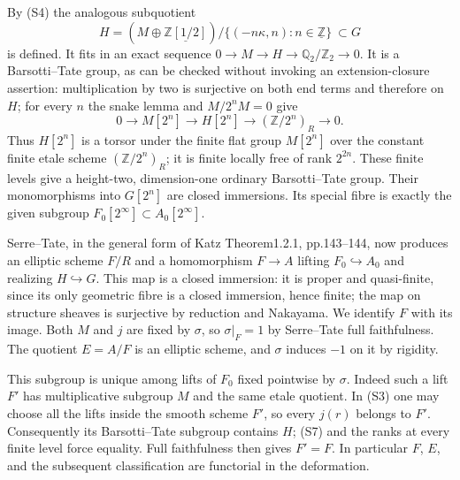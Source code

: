 By (S4) the analogous subquotient
\[
 H=(M\oplus\underline{\mathbb Z[1/2]})/
       \{(-n\kappa,n):n\in\underline{\mathbb Z}\}
       \ \subset G                                      \tag{S6}
\]
is defined. It fits in an exact sequence
$0\to M\to H\to\mathbb Q_2/\mathbb Z_2\to0$.
It is a Barsotti--Tate group, as can be checked without invoking an
extension-closure assertion: multiplication by two is surjective on
both end terms and therefore on $H$; for every $n$ the snake lemma
and $M/2^nM=0$ give
\[
 0\longrightarrow M[2^n]\longrightarrow H[2^n]
 \longrightarrow (\mathbb Z/2^n)_R\longrightarrow0.     \tag{S7}
\]
Thus $H[2^n]$ is a torsor under the finite flat group $M[2^n]$ over
the constant finite etale scheme $(\mathbb Z/2^n)_R$; it is finite
locally free of rank $2^{2n}$. These finite levels give a height-two,
dimension-one ordinary Barsotti--Tate group. Their monomorphisms into
$G[2^n]$ are closed immersions. Its special fibre is exactly the
given subgroup $F_0[2^\infty]\subset A_0[2^\infty]$.

Serre--Tate, in the general form of Katz Theorem1.2.1,
pp.143--144, now produces an elliptic scheme $F/R$ and a
homomorphism $F\to A$ lifting $F_0\hookrightarrow A_0$ and
realizing $H\hookrightarrow G$. This map is a closed immersion:
it is proper and quasi-finite, since its only geometric fibre is a
closed immersion, hence finite; the map on structure sheaves is
surjective by reduction and Nakayama. We identify $F$ with its image.
Both $M$ and $j$ are fixed by $\sigma$, so $\sigma|_F=1$ by
Serre--Tate full faithfulness. The quotient $E=A/F$ is an elliptic
scheme, and $\sigma$ induces $-1$ on it by rigidity.

This subgroup is unique among lifts of $F_0$ fixed pointwise by
$\sigma$. Indeed such a lift $F'$ has multiplicative subgroup $M$
and the same etale quotient. In (S3) one may choose all the lifts
inside the smooth scheme $F'$, so every $j(r)$ belongs to $F'$.
Consequently its Barsotti--Tate subgroup contains $H$; (S7) and
the ranks at every finite level force equality. Full faithfulness
then gives $F'=F$. In particular $F$, $E$, and the subsequent
classification are functorial in the deformation.

